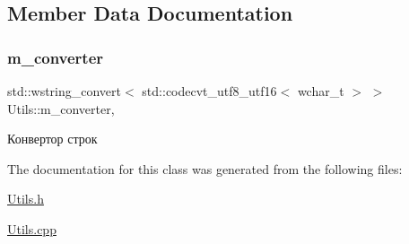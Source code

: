 \subsection{Member Data Documentation}
\mbox{\label{class_utils_a8415f00dd3b630399e0f0db336c0efa6}} 
\subsubsection{\texorpdfstring{m\+\_\+converter}{m\_converter}}
{\footnotesize\ttfamily std\+::wstring\+\_\+convert$<$ std\+::codecvt\+\_\+utf8\+\_\+utf16$<$ wchar\+\_\+t $>$ $>$ Utils\+::m\+\_\+converter\hspace{0.3cm}{\ttfamily [static]}, {\ttfamily [private]}}



Конвертор строк 



The documentation for this class was generated from the following files\+:\begin{DoxyCompactItemize}
\item 
\hyperlink{_utils_8h}{Utils.\+h}\item 
\hyperlink{_utils_8cpp}{Utils.\+cpp}\end{DoxyCompactItemize}
